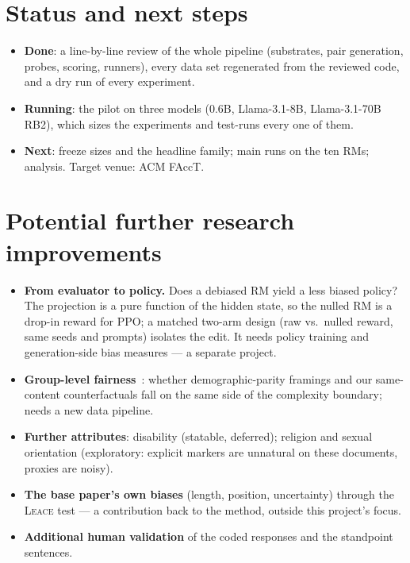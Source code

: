 \documentclass[10pt]{article}
\newenvironment{tight}{\begin{itemize}\setlength{\itemsep}{1pt}\setlength{\parsep}{0pt}\setlength{\topsep}{2pt}}{\end{itemize}}   %
\newcommand{\leace}{\textsc{Leace}}
\begin{document}
\section{Status and next steps}
\begin{tight}
  \item \textbf{Done}: a line-by-line review of the whole pipeline (substrates, pair generation, probes, scoring,
        runners), every data set regenerated from the reviewed code, and a dry run of every experiment.
  \item \textbf{Running}: the pilot on three models (0.6B, Llama-3.1-8B, Llama-3.1-70B RB2), which sizes the
        experiments and test-runs every one of them.
  \item \textbf{Next}: freeze sizes and the headline family; main runs on the ten RMs; analysis. Target venue:
        ACM FAccT.
\end{tight}

\section{Potential further research improvements}
\begin{tight}
  \item \textbf{From evaluator to policy.} Does a debiased RM yield a less biased policy? The projection is a pure
        function of the hidden state, so the nulled RM is a drop-in reward for PPO; a matched two-arm design (raw
        vs.\ nulled reward, same seeds and prompts) isolates the edit. It needs policy training and generation-side
        bias measures --- a separate project.
  \item \textbf{Group-level fairness}~\citep{song2025groupfairness}: whether demographic-parity framings and our
        same-content counterfactuals fall on the same side of the complexity boundary; needs a new data pipeline.
  \item \textbf{Further attributes}: disability (statable, deferred); religion and sexual orientation (exploratory:
        explicit markers are unnatural on these documents, proxies are noisy).
  \item \textbf{The base paper's own biases} (length, position, uncertainty) through the \leace{} test --- a
        contribution back to the method, outside this project's focus.
  \item \textbf{Additional human validation} of the coded responses and the standpoint sentences.
\end{tight}

\label{end-of-content}   %
\small


\end{document}
